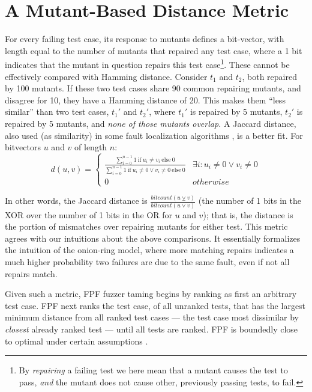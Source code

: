 \section{A Mutant-Based Distance Metric}

For every failing test case, its response to mutants defines a bit-vector, with
length equal to the number of mutants that repaired any test case,
where a 1 bit indicates that the mutant in question repairs this test
case\footnote{By \emph{repairing} a failing test we here mean that a mutant
causes the test to pass, \emph{and} the mutant does not cause
other, previously passing tests, to fail.}.  These cannot be effectively compared with Hamming distance. Consider $t_1$ and $t_2$, both repaired
by 100 mutants.  If these two test cases share 90 common repairing
mutants, and disagree for 10, they have a Hamming
distance of 20.  This makes them ``less similar'' than two test cases,
$t_1'$ and $t_2'$, where $t_1'$ is repaired by 5 mutants, $t_2'$ is
repaired by 5 mutants, and \emph{none of those mutants overlap.}   A Jaccard distance, also used (as similarity) in some fault
localization algorithms \cite{Pinpoint}, is a better fit.  For bitvectors $u$ and $v$ of length $n$:
\[d(u,v) = 
\begin{cases}
\frac{\sum_{i=0}^{n-1} 1\ \text{if}\ u_i \neq v_i\ \text{else}\ 0}{\sum_{i=0}^{n-1} 1
\  \text{if}\ u_i \neq 0 \vee v_i \neq 0\ \text{else}\ 0} & \exists i:u_i\neq 0 \vee v_i\neq 0\\
0 & otherwise
\end{cases}
\]

\noindent In other words, the Jaccard distance is $\frac{\mathit{bitcount}(u
\veebar v)}{\mathit{bitcount}(u \vee v)}$ (the number of 1 bits in the
XOR over the number of 1 bits in the OR for $u$ and $v$); that is, the
distance is the portion of mismatches over repairing mutants for
either test.  This metric agrees with our intuitions about the above comparisons.  It
essentially formalizes the intuition of the onion-ring model, where
more matching repairs indicates a much higher probability two failures
are due to the same fault, even if not all repairs match.

Given such a metric, FPF \cite{Gonzalez} fuzzer taming \cite{PLDI13}
begins by ranking as first an arbitrary test case.   FPF next ranks the test
case, of all unranked tests, that has the largest minimum distance
from all ranked test cases --- the test case most dissimilar by \emph{closest}
already ranked test --- until all tests are ranked.  FPF is boundedly close
to optimal under certain assumptions \cite{Gonzalez}.

